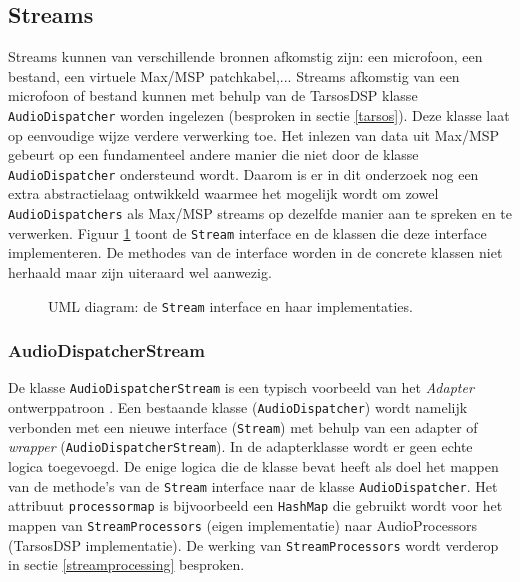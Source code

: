 \subsection{Streams}
\label{streams-design}

Streams kunnen van verschillende bronnen afkomstig zijn: een microfoon, een bestand, een virtuele Max/MSP patchkabel,... Streams afkomstig van een microfoon of bestand kunnen met behulp van de TarsosDSP klasse \texttt{AudioDispatcher} worden ingelezen (besproken in sectie \ref{tarsos}). Deze klasse laat op eenvoudige wijze verdere verwerking toe. Het inlezen van data uit Max/MSP gebeurt op een fundamenteel andere manier die niet door de klasse \texttt{AudioDispatcher} ondersteund wordt. Daarom is er in dit onderzoek nog een extra abstractielaag ontwikkeld waarmee het mogelijk wordt om zowel \texttt{AudioDispatchers} als Max/MSP streams op dezelfde manier aan te spreken en te verwerken. Figuur \ref{StreamUml} toont de \texttt{Stream} interface en de klassen die deze interface implementeren. De methodes van de interface worden in de concrete klassen niet herhaald maar zijn uiteraard wel aanwezig.

\begin{figure}[h!]
	\captionsetup{width=0.7\textwidth}
	\caption[UML diagram van streams]{UML diagram: de \texttt{Stream} interface en haar implementaties.}
	\begin{center}
		\advance\parskip0.3cm
		
	\end{center}
	\label{StreamUml}
\end{figure}

\subsubsection{AudioDispatcherStream}
De klasse \texttt{AudioDispatcherStream} is een typisch voorbeeld van het \textit{Adapter} ontwerppatroon \cite{vlissides1995design}. Een bestaande klasse (\texttt{AudioDispatcher}) wordt namelijk verbonden met een nieuwe interface (\texttt{Stream}) met behulp van een adapter of \textit{wrapper} (\texttt{AudioDispatcherStream}). In de adapterklasse wordt er geen echte logica toegevoegd. De enige logica die de klasse bevat heeft als doel het mappen van de methode's van de \texttt{Stream} interface naar de klasse \texttt{AudioDispatcher}. Het attribuut \texttt{processormap} is bijvoorbeeld een \texttt{HashMap} die gebruikt wordt voor het mappen van \texttt{StreamProcessors} (eigen implementatie) naar AudioProcessors (TarsosDSP implementatie). De werking van \texttt{StreamProcessors} wordt verderop in sectie \ref{streamprocessing} besproken.

